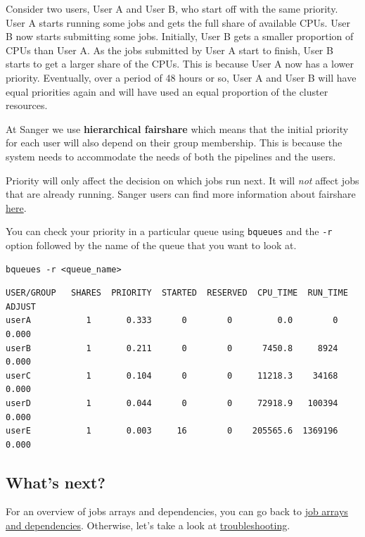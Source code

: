 \documentclass[11pt]{article}
\begin{document}
    Consider two users, User A and User B, who start off with the same
priority. User A starts running some jobs and gets the full share of
available CPUs. User B now starts submitting some jobs. Initially, User
B gets a smaller proportion of CPUs than User A. As the jobs submitted
by User A start to finish, User B starts to get a larger share of the
CPUs. This is because User A now has a lower priority. Eventually, over
a period of 48 hours or so, User A and User B will have equal priorities
again and will have used an equal proportion of the cluster resources.

At Sanger we use \textbf{hierarchical fairshare} which means that the
initial priority for each user will also depend on their group
membership. This is because the system needs to accommodate the needs of
both the pipelines and the users.

Priority will only affect the decision on which jobs run next. It will
\textit{not} affect jobs that are already running. Sanger users can find
more information about fairshare
\href{mediawiki.internal.sanger.ac.uk/index.php/LSF_hierarchical_fair_share}{here}.

    You can check your priority in a particular queue using \texttt{bqueues}
and the \texttt{-r} option followed by the name of the queue that you
want to look at.

    \begin{verbatim}
bqueues -r <queue_name>
\end{verbatim}

    \begin{verbatim}
USER/GROUP   SHARES  PRIORITY  STARTED  RESERVED  CPU_TIME  RUN_TIME   ADJUST
userA           1       0.333      0        0         0.0        0       0.000
userB           1       0.211      0        0      7450.8     8924       0.000
userC           1       0.104      0        0     11218.3    34168       0.000
userD           1       0.044      0        0     72918.9   100394       0.000
userE           1       0.003     16        0    205565.6  1369196       0.000
\end{verbatim}

\newpage

    \subsection{What's next?}\label{whats-next}

For an overview of jobs arrays and dependencies, you can go back to
\href{job_arrays.ipynb}{job arrays and dependencies}. Otherwise, let's
take a look at \href{troubleshooting.ipynb}{troubleshooting}.
\end{document}
